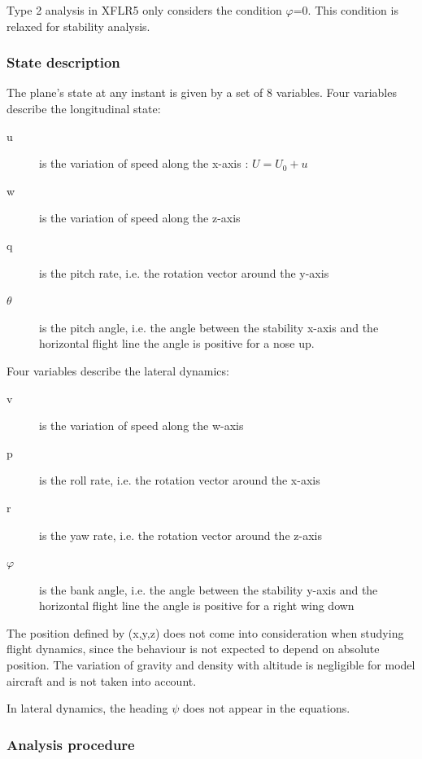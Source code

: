 \documentclass[a4paper,twoside,12pt,dvips]{article}
\begin{document}
Type 2 analysis in XFLR5 only considers the condition
\textrm{${\varphi}$}=0. This condition is relaxed for stability
analysis.

\subsubsection{State description}

The plane's state at any instant is given by a set of 8
variables. Four variables describe the longitudinal state:

\begin{description}
\item[u] is the variation of speed along the x-axis : $U = U_0 + u$
\item[w] is the variation of speed along the z-axis
\item[q] is the pitch rate, i.e. the rotation vector around the
y-axis
\item[$\theta$] is the pitch angle, i.e. the angle
between the stability x-axis and the horizontal flight line\newline
the angle is positive for a nose up.
\end{description}

Four variables describe the lateral dynamics:

\begin{description}
\item[v] is the variation of speed along the w-axis
\item[p] is the roll rate, i.e. the rotation vector around the x-axis
\item[r] is the yaw rate, i.e. the rotation vector around the z-axis
\item[$\varphi$] is the bank angle, i.e. the angle
between the stability y-axis and the horizontal flight line\newline
the angle is positive for a right wing down
\end{description}

The position defined by (x,y,z) does not come into consideration when
studying flight dynamics, since the behaviour is not expected to depend
on absolute position. The variation of gravity and density with
altitude is negligible for model aircraft and is not taken into
account.

In lateral dynamics, the heading \textrm{${\psi}$} does not appear in
the equations.

\subsubsection{Analysis procedure}
\end{document}
